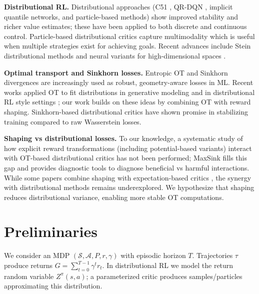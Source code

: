 \documentclass{article}
\begin{document}
\textbf{Distributional RL.} Distributional approaches (C51 \cite{bellemare2017distributional}, QR-DQN \cite{dabney2018distributional}, implicit quantile networks, and particle-based methods) show improved stability and richer value estimates; these have been applied to both discrete and continuous control. Particle-based distributional critics capture multimodality which is useful when multiple strategies exist for achieving goals. Recent advances include Stein distributional methods \cite{rowland2019stein} and neural variants for high-dimensional spaces \cite{yang2019fully}.

\textbf{Optimal transport and Sinkhorn losses.} Entropic OT and Sinkhorn divergences \cite{cuturi2013sinkhorn,feydy2019interpolating} are increasingly used as robust, geometry-aware losses in ML. Recent works applied OT to fit distributions in generative modeling and in distributional RL style settings \cite{genevay2018learning}; our work builds on these ideas by combining OT with reward shaping. Sinkhorn-based distributional critics \cite{abdullah2020wasserstein} have shown promise in stabilizing training compared to raw Wasserstein losses.

\textbf{Shaping vs distributional losses.} To our knowledge, a systematic study of how explicit reward transformations (including potential-based variants) interact with OT-based distributional critics has not been performed; MaxSink fills this gap and provides diagnostic tools to diagnose beneficial vs harmful interactions. While some papers combine shaping with expectation-based critics \cite{devlin2012dynamic}, the synergy with distributional methods remains underexplored. We hypothesize that shaping reduces distributional variance, enabling more stable OT computations.

\section{Preliminaries}
We consider an MDP $(\mathcal{S},\mathcal{A},P,r,\gamma)$ with episodic horizon $T$. Trajectories $\tau$ produce returns $G=\sum_{t=0}^{T-1}\gamma^t r_t$. In distributional RL we model the return random variable $Z^\pi(s,a)$; a parameterized critic produces samples/particles approximating this distribution.
\end{document}
